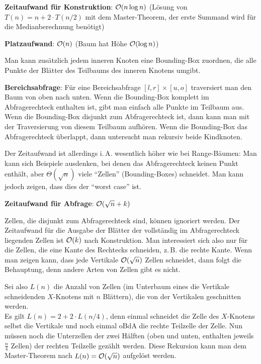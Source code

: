 \textbf{Zeitaufwand für Konstruktion}:
$\mathcal{O}(n \log n)$
(Lösung von $T(n) = n + 2 \cdot T(n/2)$ mit dem Master-Theorem, der erste Summand
wird für die Medianberechnung benötigt)

\textbf{Platzaufwand}:
$\mathcal{O}(n)$
(Baum hat Höhe $\mathcal{O}(\log n)$)

\linie

Man kann zusätzlich jedem inneren Knoten eine Bounding-Box zuordnen,
die alle Punkte der Blätter des Teilbaums des inneren Knotens umgibt.

\textbf{Bereichsabfrage}:
Für eine Bereichsabfrage $[l, r] \times [u, o]$ traversiert man den Baum von oben nach unten.
Wenn die Bounding-Box komplett im Abfragerechteck enthalten ist, gibt man einfach alle Punkte
im Teilbaum aus.
Wenn die Bounding-Box disjunkt zum Abfragerechteck ist, dann kann man mit der Traversierung
von diesem Teilbaum aufhören.
Wenn die Bounding-Box das Abfragerechteck überlappt, dann untersucht man rekursiv beide Kindknoten.

Der Zeitaufwand ist allerdings i.\,A. wesentlich höher wie bei Range-Bäumen:
Man kann sich Beispiele ausdenken, bei denen das Abfragerechteck keinen Punkt enthält,
aber $\Theta(\sqrt{n})$ viele "`Zellen"' (Bounding-Boxes) schneidet.
Man kann jedoch zeigen, dass dies der "`worst case"' ist.

\linie

\textbf{Zeitaufwand für Abfrage}:
$\mathcal{O}(\sqrt{n} + k)$

\begin{Beweis}
    Zellen, die disjunkt zum Abfragerechteck sind, können ignoriert werden.
    Der Zeitaufwand für die Ausgabe der Blätter der vollständig im Abfragerechteck liegenden Zellen
    ist $\mathcal{O}(k)$ nach Konstruktion.
    Man interessiert sich also nur für die Zellen, die eine Kante des Rechtecks schneiden,
    z.\,B. die rechte Kante.
    Wenn man zeigen kann, dass jede Vertikale $\mathcal{O}(\sqrt{n})$ Zellen schneidet, dann folgt die
    Behauptung, denn andere Arten von Zellen gibt es nicht.
    
    Sei also $L(n)$ die Anzahl von Zellen
    (im Unterbaum eines die Vertikale schneidenden $X$-Knotens mit $n$ Blättern),
    die von der Vertikalen geschnitten werden.\\
    Es gilt $L(n) = 2 + 2 \cdot L(n/4)$,
    denn einmal schneidet die Zelle des $X$-Knotens selbst die Vertikale und noch einmal oBdA
    die rechte Teilzelle der Zelle.
    Nun müssen noch die Unterzellen der zwei Hälften
    (oben und unten, enthalten jeweils $\frac{n}{4}$ Zellen)
    der rechten Teilzelle gezählt werden.
    Diese Rekursion kann man dem Master-Theorem nach $L(n) = \mathcal{O}(\sqrt{n})$ aufgelöst werden.
\end{Beweis}


